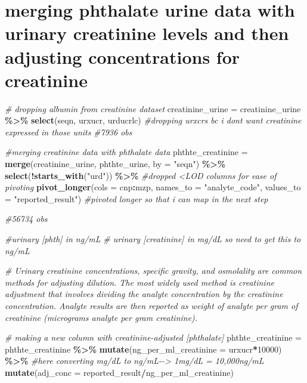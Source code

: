 \documentclass[
]{article}
\newenvironment{Shaded}{\begin{snugshade}}{\end{snugshade}}
\newcommand{\AttributeTok}[1]{\textcolor[rgb]{0.13,0.29,0.53}{#1}}
\newcommand{\CommentTok}[1]{\textcolor[rgb]{0.56,0.35,0.01}{\textit{#1}}}
\newcommand{\DecValTok}[1]{\textcolor[rgb]{0.00,0.00,0.81}{#1}}
\newcommand{\FunctionTok}[1]{\textcolor[rgb]{0.13,0.29,0.53}{\textbf{#1}}}
\newcommand{\NormalTok}[1]{#1}
\newcommand{\OtherTok}[1]{\textcolor[rgb]{0.56,0.35,0.01}{#1}}
\newcommand{\SpecialCharTok}[1]{\textcolor[rgb]{0.81,0.36,0.00}{\textbf{#1}}}
\newcommand{\StringTok}[1]{\textcolor[rgb]{0.31,0.60,0.02}{#1}}
\begin{document}
\hypertarget{merging-phthalate-urine-data-with-urinary-creatinine-levels-and-then-adjusting-concentrations-for-creatinine}{%
\section{merging phthalate urine data with urinary creatinine levels and
then adjusting concentrations for
creatinine}\label{merging-phthalate-urine-data-with-urinary-creatinine-levels-and-then-adjusting-concentrations-for-creatinine}}

\begin{Shaded}
\begin{Highlighting}[]
\CommentTok{\# dropping albumin from creatinine dataset}
\NormalTok{creatinine\_urine }\OtherTok{=}
\NormalTok{  creatinine\_urine }\SpecialCharTok{\%\textgreater{}\%} 
  \FunctionTok{select}\NormalTok{(seqn, urxucr, urducrlc) }\CommentTok{\#dropping urxcrs bc i dont want creatinine expressed in those units}
\CommentTok{\#7936 obs}

\CommentTok{\#merging creatinine data with phthalate data}
\NormalTok{phthte\_creatinine }\OtherTok{=}
  \FunctionTok{merge}\NormalTok{(creatinine\_urine, phthte\_urine, }\AttributeTok{by =} \StringTok{"seqn"}\NormalTok{) }\SpecialCharTok{\%\textgreater{}\%}
  \FunctionTok{select}\NormalTok{(}\SpecialCharTok{!}\FunctionTok{starts\_with}\NormalTok{(}\StringTok{"urd"}\NormalTok{)) }\SpecialCharTok{\%\textgreater{}\%} \CommentTok{\#dropped \textless{}LOD columns for ease of pivoting}
  \FunctionTok{pivot\_longer}\NormalTok{(}\AttributeTok{cols =}\NormalTok{ cnp}\SpecialCharTok{:}\NormalTok{mzp,  }
               \AttributeTok{names\_to =} \StringTok{"analyte\_code"}\NormalTok{,}
               \AttributeTok{values\_to =} \StringTok{"reported\_result"}\NormalTok{) }\CommentTok{\#pivoted longer so that i can map in the next step}

\CommentTok{\#56734 obs }

\CommentTok{\#urinary [phth] in ng/mL}
\CommentTok{\# urinary [creatinine] in mg/dL so need to get this to ng/mL}

\CommentTok{\# Urinary creatinine concentrations, specific gravity, and osmolality are common methods for adjusting dilution. The most widely used method is creatinine adjustment that involves dividing the analyte concentration by the creatinine concentration. Analyte results are then reported as weight of analyte per gram of creatinine (micrograms analyte per gram creatinine).}

\CommentTok{\# making a new column with creatinine{-}adjusted [phthalate]}
\NormalTok{phthte\_creatinine }\OtherTok{=}
\NormalTok{  phthte\_creatinine }\SpecialCharTok{\%\textgreater{}\%} 
  \FunctionTok{mutate}\NormalTok{(}\AttributeTok{ng\_per\_ml\_creatinine =}\NormalTok{ urxucr}\SpecialCharTok{*}\DecValTok{10000}\NormalTok{) }\SpecialCharTok{\%\textgreater{}\%} \CommentTok{\#here converting mg/dL to ng/mL{-}{-}\textgreater{} 1mg/dL = 10,000ng/mL}
  \FunctionTok{mutate}\NormalTok{(}\AttributeTok{adj\_conc =}\NormalTok{ reported\_result}\SpecialCharTok{/}\NormalTok{ng\_per\_ml\_creatinine)}


\end{Highlighting}
\end{Shaded}
\end{document}
